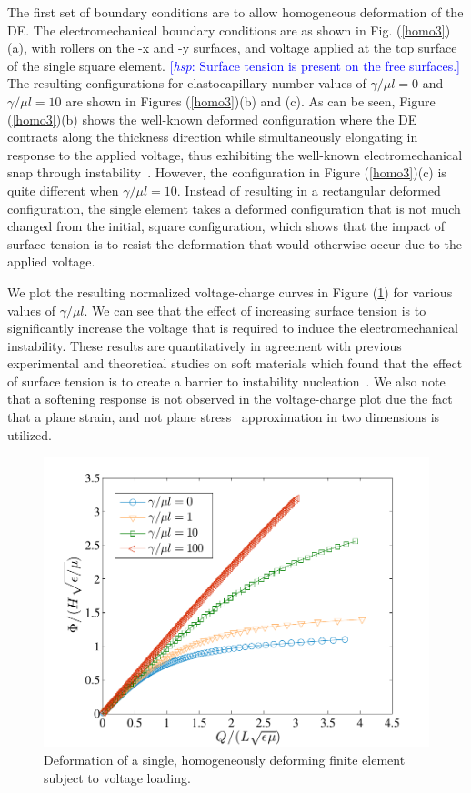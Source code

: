 \documentclass[8.5pt,twoside,twocolumn]{article}
\newcommand{\hsp}[1]{\textcolor{blue}{[\textit{hsp}: #1]}}
\begin{document}
The first set of boundary conditions are to allow homogeneous deformation of the DE. The electromechanical boundary conditions are as shown in Fig. (\ref{homo3})(a), with rollers on the -x and -y surfaces, and voltage applied at the top surface of the single square element.  \hsp{Surface tension is present on the free surfaces.}  The resulting configurations for elastocapillary number values of $\gamma/\mu l=0$ and $\gamma/\mu l=10$ are shown in Figures (\ref{homo3})(b) and (c).  As can be seen, Figure (\ref{homo3})(b) shows the well-known deformed configuration where the DE contracts along the thickness direction while simultaneously elongating in response to the applied voltage, thus exhibiting the well-known electromechanical snap through instability~\cite{parkIJSS2012}.  However, the configuration in Figure (\ref{homo3})(c) is quite different when $\gamma/\mu l=10$.  Instead of resulting in a rectangular deformed configuration, the single element takes a deformed configuration that is not much changed from the initial, square configuration, which shows that the impact of surface tension is to resist the deformation that would otherwise occur due to the applied voltage.

We plot the resulting normalized voltage-charge curves in Figure (\ref{homo}) for various values of $\gamma/\mu l$.  We can see that the effect of increasing surface tension is to significantly increase the voltage that is required to induce the electromechanical instability.  These results are quantitatively in agreement with previous experimental and theoretical studies on soft materials which found that the effect of surface tension is to create a barrier to instability nucleation~\citep{chenPRL2012,moraSM2011}.  We also note that a softening response is not observed in the voltage-charge plot due the fact that a plane strain, and not plane stress~\citep{zhouIJSS2008} approximation in two dimensions is utilized. 

\begin{figure} \begin{center} 
\includegraphics[scale=0.6]{pics/voltage_hom.pdf}
\caption{Deformation of a single, homogeneously deforming finite element subject to voltage loading.}  
\label{homo} \end{center} \end{figure}
\end{document}
